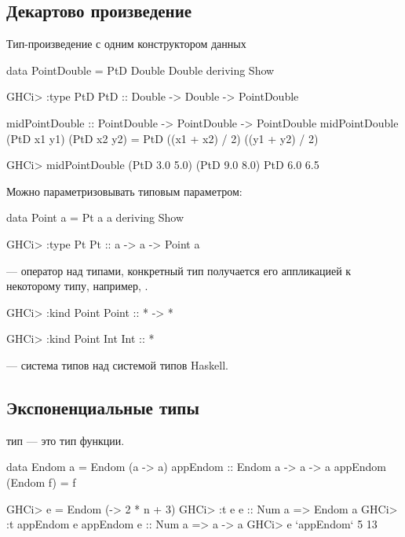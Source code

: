 \documentclass[11pt,a4paper]{article}
\begin{document}
\subsection{Декартово произведение}
Тип-произведение с одним конструктором данных
\begin{hscode}
data PointDouble = PtD Double Double
deriving Show

GHCi> :type PtD
PtD :: Double -> Double -> PointDouble

midPointDouble :: PointDouble -> PointDouble
-> PointDouble
midPointDouble (PtD x1 y1) (PtD x2 y2) =
PtD ((x1 + x2) / 2) ((y1 + y2) / 2)

GHCi> midPointDouble (PtD 3.0 5.0) (PtD 9.0 8.0)
PtD 6.0 6.5
\end{hscode}
Можно параметризовывать типовым параметром:
\begin{hscode}
data Point a = Pt a a
deriving Show

GHCi> :type Pt
Pt :: a -> a -> Point a
\end{hscode}
 --- оператор над типами, конкретный тип получается его аппликацией к некоторому типу, например, .
\begin{hscode}
GHCi> :kind Point
Point :: * -> *

GHCi> :kind Point Int
Int :: *
\end{hscode}
 --- система типов над системой типов Haskell.
\subsection{Экспоненциальные типы}
 тип --- это тип функции.
\begin{hscode}
data Endom a = Endom (a -> a)
appEndom :: Endom a -> a -> a
appEndom (Endom f) = f

GHCi> e = Endom (\n -> 2 * n + 3)
GHCi> :t e
e :: Num a => Endom a
GHCi> :t appEndom e
appEndom e :: Num a => a -> a
GHCi> e `appEndom` 5
13
\end{hscode}
\end{document}
